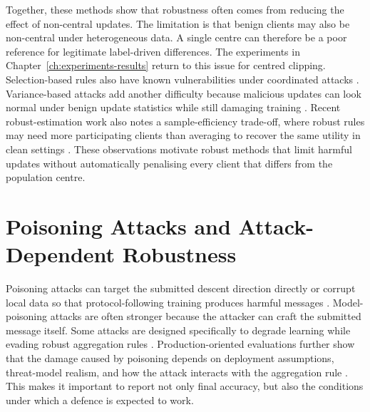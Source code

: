 Together, these methods show that robustness often comes from reducing the
effect of non-central updates. The limitation is that benign clients may also
be non-central under heterogeneous data. A single centre can therefore be a
poor reference for legitimate label-driven differences. The experiments in
Chapter~\ref{ch:experiments-results} return to this issue for centred
clipping. Selection-based rules also have known vulnerabilities under
coordinated attacks \cite{pmlr-v80-mhamdi18a}.
Variance-based attacks add another difficulty because malicious updates can look
normal under benign update statistics while still damaging training
\cite{BarBarGol:19}. Recent robust-estimation work also notes a
sample-efficiency trade-off, where robust rules may need more participating
clients than averaging to recover the same utility in clean settings
\cite{vlaski2022robustefficientaggregation}. These observations motivate robust methods that limit harmful updates without
automatically penalising every client that differs from the population centre.
\section{Poisoning Attacks and Attack-Dependent Robustness}

Poisoning attacks can target the submitted descent direction directly or
corrupt local data so that protocol-following training produces harmful
messages
\cite{KairouzMcMahanAvent:21}. Model-poisoning attacks are often stronger
because the attacker can craft the submitted message itself. Some attacks are
designed specifically to degrade learning while evading robust aggregation rules
\cite{10.5555/3489212.3489304}. Production-oriented evaluations further show that the damage caused by
poisoning depends on deployment assumptions, threat-model realism, and how the
attack interacts with the aggregation rule \cite{9833647}. This makes it important to report not only final accuracy, but
also the conditions under which a defence is expected to work.

